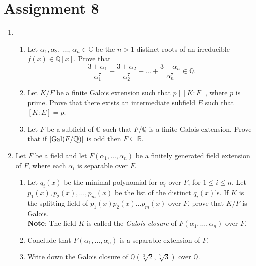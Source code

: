 \documentclass[notoc,notitlepage,nobib]{tufte-book}
\DeclareMathOperator{\Gal}{Gal}
\begin{document}

\section{Assignment 8}%
\label{sec:assignment_8}

\begin{enumerate}
	\item \begin{enumerate}
      \item Let $\alpha_1, \alpha_2, \, \ldots, \, \alpha_n \in \mathbb{C}$ be
        the $n > 1$ distinct roots of an irreducible $f(x) \in \mathbb{Q}[x]$.
        Prove that
        \begin{equation*}
          \frac{3 + \alpha_1}{\alpha_1^7} + \frac{3 + \alpha_2}{\alpha_2^7} +
          \hdots + \frac{3 + \alpha_n}{\alpha_n^7} \in \mathbb{Q}.
        \end{equation*}
      \item Let $K / F$ be a finite Galois extension such that $p \mid [ K : F
        ]$, where $p$ is prime. Prove that there exists an intermediate subfield
        $E$ such that $[K : E] = p$.
      \item Let $F$ be a subfield of $\mathbb{C}$ such that $F / \mathbb{Q}$ is
        a finite Galois extension. Prove that if $\abs{ \Gal(F / \mathbb{Q}) }$
        is odd then $F \subseteq \mathbb{R}$.
    \end{enumerate}
  \item Let $F$ be a field and let $F(\alpha_1, \ldots, \alpha_n)$ be a finitely
    generated field extension of $F$, where each $\alpha_i$ is separable over
    $F$.
    \begin{enumerate}
      \item Let $q_i(x)$ be the minimal polynomial for $\alpha_i$ over $F$, for
        $1 \leq i \leq n$. Let $p_1(x), p_2(x), \ldots, p_m(x)$ be the list of
        the distinct $q_i(x)$'s. If $K$ is the splitting field of $p_1(x) p_2(x)
        \hdots p_m(x)$ over $F$, prove that $K / F$ is Galois. \\
        \textbf{Note}: The field $K$ is called the \textit{Galois closure} of
        $F(\alpha_1, \ldots, \alpha_n)$ over $F$.
      \item Conclude that $F(\alpha_1, \ldots, \alpha_n)$ is a separable
        extension of $F$.
      \item Write down the Galois closure of $\mathbb{Q}(\sqrt[3]{2},
        \sqrt[7]{3})$ over $\mathbb{Q}$.

\end{enumerate}
\end{enumerate}
\end{document}
